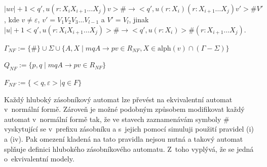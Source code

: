 \begin{Alg}
\begin{list}{}{\setlength\parsep{0cm} \setlength\itemsep{0cm} \setlength\leftmargin{1em}}
  \subsubitem $|uv|+1 <q',u(r : X_i X_{i+1} \dots X_j)v> \# \rightarrow <q',u(r : X_i) (r: X_{i+1} \dots X_j)v'>\# V' $,
  \subsubitem kde $v \ne \varepsilon$, $v' = V_1 V_2 V_3 \dots V_{l-1}$ a $V'=V_l$, jinak \medskip
  \subsubitem $|u|+1 <q',u(r : X_i X_{i+1} \dots X_j)> \# \rightarrow <q',u(r : X_i)>\# (r: X_{i+1} \dots X_j)$.\bigskip

  \item ${\Gamma}_{NF} :=\{\#\} \cup \Sigma \cup \{A, X \mid mqA \rightarrow pv \in R_{NF}, X \in \mathrm{alph}(v) \cap (\Gamma - \Sigma) \}$
  \item $Q_{NF} := \{p,q \mid mqA \rightarrow pv \in R_{NF}\} $
  \item $F_{NF} := \{<q, \varepsilon> \mid  q \in F \}$


\end{list}
\end{Alg}

Každý hluboký zásobníkový automat lze převést na ekvivalentní automat v~normální formě. Zároveň je možné podobným způsobem modifikovat každý automat v~normální formě tak, že ve stavech zaznamenávám symboly $\#$ vyskytující se v~prefixu zásobníku a s~jejich pomocí simuluji použití pravidel (i) a (iv). Pak omezení kladená na tato pravidla nejsou nutná a takový automat splňuje definici hlubokého zásobníkového automatu. Z~toho vyplývá, že se jedná o~ekvivalentní modely.

